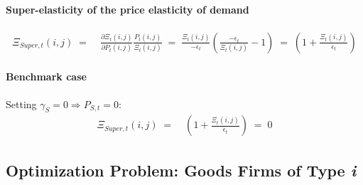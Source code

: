 \documentclass[12pt,3p,authoryear,review]{elsarticle}
\begin{document}
\begin{small}
	\paragraph{Super-elasticity of the price elasticity of demand}%
	\begin{align}%
		\Xi_{Super,t}(i,j) \; = & \; \frac{\partial \Xi_t(i,j)}{\partial P_t(i,j)} \frac{P_t(i,j)}{\Xi_t(i,j)} \; = \; \frac{\Xi_t(i,j)}{-\epsilon_t} \left(\frac{-\epsilon_t}{\Xi_t(i,j)}-1\right) \; = \; \left(1+\frac{\Xi_t(i,j)}{\epsilon_t}\right)%
	\end{align}%
	\paragraph{Benchmark case} Setting $\gamma_S=0 \Rightarrow P_{S,t} = 0$:%
	\begin{align}
		\Xi_{Super,t}(i,j) \; = & \; \left(1+\frac{\Xi_t(i,j)}{\epsilon_t}\right) \; = \; 0%
	\end{align}
\end{small}%
\bigskip%
\pagebreak%
\subsection{Optimization Problem: Goods Firms of Type \textit{i}}
\end{document}
